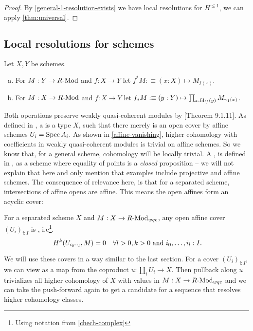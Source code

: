 \begin{proof}
  By \cref{general-1-resolution-exists} we have local resolutions for $H^{\leq 1}$,
  we can apply \cref{thm:universal}.
\end{proof}

\subsection{Local resolutions for schemes}

\begin{definition}
  Let $X,Y$ be schemes.
  \begin{enumerate}[(a)]
  \item For $M:Y\to R\text{-}\mathrm{Mod}$ and $f:X\to Y$ let $f^*M:\equiv (x:X)\mapsto M_{f(x)}$.
  \item For $M:X\to R\text{-}\mathrm{Mod}$ and $f:X\to Y$ let $f_*M:\equiv (y:Y)\mapsto \prod_{x:\mathrm{fib}_f(y)}M_{\pi_1(x)}$.
  \end{enumerate}
\end{definition}

Both operations preserve weakly quasi-coherent modules by \cite{draft}[Theorem 9.1.11].
As defined in \cite{draft}, a  is a type $X$, such that there merely is an open cover by affine schemes $U_i=\operatorname{Spec} A_i$.
As shown in \cref{affine-vanishing},
higher cohomology with coefficients in weakly quasi-coherent modules is trivial on affine schemes.
So we know that, for a general scheme, cohomology will be locally trivial.
A , is defined in \cite{draft}, as a scheme where equality of points is a \emph{closed} proposition
-- we will not explain that here and only mention that examples include projective and affine schemes.
The consequence of relevance here, is that for a separated scheme,
intersections of affine opens are affine.
This means the open affines form an acyclic cover:

\begin{remark}
  For a separated scheme $X$ and $M:X\to R\text{-}\mathrm{Mod}_{wqc}$,
  any open affine cover $(U_i)_{i:I}$ is ,
  i.e\footnote{Using notation from \cref{chech-complex}}.
  \[
    H^k(U_{i_0\dotsi_l},M)=0\quad \forall l>0, k>0 \text{ and } i_0,\dots,i_l:I
    \rlap{.}
  \]
\end{remark}

We will use these covers in a way similar to the last section.
For a cover $(U_i)_{i:I}$, we can view as a map from the coproduct $u:\coprod_iU_i\to X$.
Then pullback along $u$ trivializes all higher cohomology of $X$ with values in $M:X\to R\text{-}\mathrm{Mod}_{wqc}$
and we can take the push-forward again to get a candidate for a sequence that resolves higher cohomology classes.

